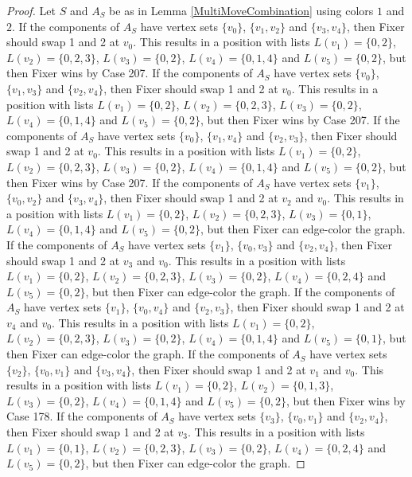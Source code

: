 \documentclass[12pt]{amsart}
\theoremstyle{plain}
\theoremstyle{definition}
\theoremstyle{remark}
\begin{document}
\begin{proof}
Let $S$ and $A_S$ be as in Lemma \ref{MultiMoveCombination} using colors $1$ and $2$. If the components of $A_S$ have vertex sets $\{v_0\}$, $\{v_1, v_2\}$ and $\{v_3, v_4\}$, then Fixer should swap 1 and 2 at $v_0$. This results in a position with lists $L(v_1) = \{0, 2\}$, $L(v_2) = \{0, 2, 3\}$, $L(v_3) = \{0, 2\}$, $L(v_4) = \{0, 1, 4\}$ and $L(v_5) = \{0, 2\}$, but then Fixer wins by Case 207.
If the components of $A_S$ have vertex sets $\{v_0\}$, $\{v_1, v_3\}$ and $\{v_2, v_4\}$, then Fixer should swap 1 and 2 at $v_0$. This results in a position with lists $L(v_1) = \{0, 2\}$, $L(v_2) = \{0, 2, 3\}$, $L(v_3) = \{0, 2\}$, $L(v_4) = \{0, 1, 4\}$ and $L(v_5) = \{0, 2\}$, but then Fixer wins by Case 207.
If the components of $A_S$ have vertex sets $\{v_0\}$, $\{v_1, v_4\}$ and $\{v_2, v_3\}$, then Fixer should swap 1 and 2 at $v_0$. This results in a position with lists $L(v_1) = \{0, 2\}$, $L(v_2) = \{0, 2, 3\}$, $L(v_3) = \{0, 2\}$, $L(v_4) = \{0, 1, 4\}$ and $L(v_5) = \{0, 2\}$, but then Fixer wins by Case 207.
If the components of $A_S$ have vertex sets $\{v_1\}$, $\{v_0, v_2\}$ and $\{v_3, v_4\}$, then Fixer should swap 1 and 2 at $v_2$ and $v_0$. This results in a position with lists $L(v_1) = \{0, 2\}$, $L(v_2) = \{0, 2, 3\}$, $L(v_3) = \{0, 1\}$, $L(v_4) = \{0, 1, 4\}$ and $L(v_5) = \{0, 2\}$, but then Fixer can edge-color the graph.
If the components of $A_S$ have vertex sets $\{v_1\}$, $\{v_0, v_3\}$ and $\{v_2, v_4\}$, then Fixer should swap 1 and 2 at $v_3$ and $v_0$. This results in a position with lists $L(v_1) = \{0, 2\}$, $L(v_2) = \{0, 2, 3\}$, $L(v_3) = \{0, 2\}$, $L(v_4) = \{0, 2, 4\}$ and $L(v_5) = \{0, 2\}$, but then Fixer can edge-color the graph.
If the components of $A_S$ have vertex sets $\{v_1\}$, $\{v_0, v_4\}$ and $\{v_2, v_3\}$, then Fixer should swap 1 and 2 at $v_4$ and $v_0$. This results in a position with lists $L(v_1) = \{0, 2\}$, $L(v_2) = \{0, 2, 3\}$, $L(v_3) = \{0, 2\}$, $L(v_4) = \{0, 1, 4\}$ and $L(v_5) = \{0, 1\}$, but then Fixer can edge-color the graph.
If the components of $A_S$ have vertex sets $\{v_2\}$, $\{v_0, v_1\}$ and $\{v_3, v_4\}$, then Fixer should swap 1 and 2 at $v_1$ and $v_0$. This results in a position with lists $L(v_1) = \{0, 2\}$, $L(v_2) = \{0, 1, 3\}$, $L(v_3) = \{0, 2\}$, $L(v_4) = \{0, 1, 4\}$ and $L(v_5) = \{0, 2\}$, but then Fixer wins by Case 178.
If the components of $A_S$ have vertex sets $\{v_3\}$, $\{v_0, v_1\}$ and $\{v_2, v_4\}$, then Fixer should swap 1 and 2 at $v_3$. This results in a position with lists $L(v_1) = \{0, 1\}$, $L(v_2) = \{0, 2, 3\}$, $L(v_3) = \{0, 2\}$, $L(v_4) = \{0, 2, 4\}$ and $L(v_5) = \{0, 2\}$, but then Fixer can edge-color the graph.

\end{proof}
\end{document}
